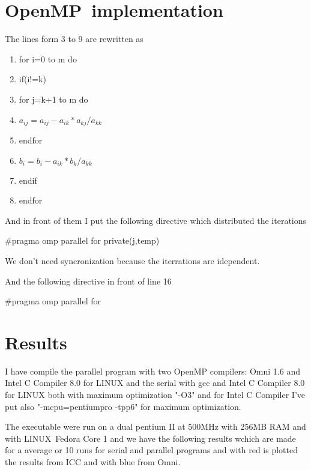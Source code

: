 \documentclass[a4paper]{article}
\begin{document}
\section{OpenMP\ implementation}

The lines form 3 to 9 are rewritten as  

\begin{enumerate}
\item for i=0 to m do

\item \qquad if(i!=k)

\item \qquad \qquad for j=k+1 to m do

\item \qquad \qquad \qquad $a_{ij}=a_{ij}-a_{ik}\ast a_{kj}/a_{kk}$

\item \qquad \qquad endfor

\item \qquad \qquad $b_{i}=b_{i}-a_{ik}\ast b_{k}/a_{kk}$

\item \qquad endif

\item endfor
\end{enumerate}

And in front of them I put the following directive which distributed the
iterations

\begin{center}
\#pragma omp parallel for private(j,temp)
\end{center}

We don't need syncronization because the iterrations are idependent.

And the following directive in front of line 16

\begin{center}
\#pragma omp parallel for
\end{center}

\section{Results}

I have compile the parallel program with two OpenMP compilers: Omni 1.6 and
Intel C Compiler 8.0 for LINUX and the serial with gcc and Intel C Compiler
8.0 for LINUX both with maximum optimization "-O3" and for Intel C Compiler
I've put also "-mcpu=pentiumpro -tpp6" for maximum optimization.

The executable were run on a dual pentium II at 500MHz with 256MB RAM and
with LINUX\ Fedora Core 1 and we have the following results wchich are made
for a average or 10 runs for serial and parallel programs and with red is
plotted the results from ICC and with blue from Omni.

\begin{center}
\end{center}
\end{document}
